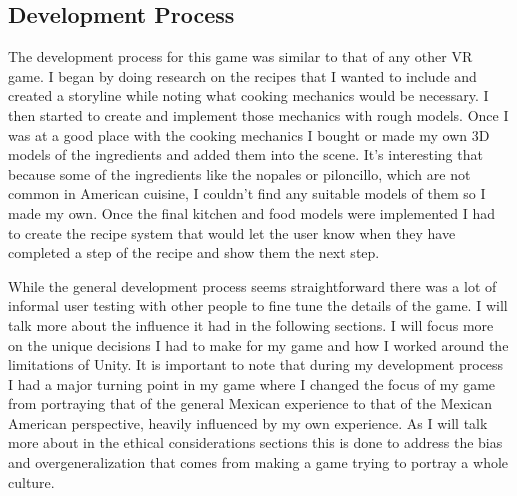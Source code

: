 \documentclass[10pt,twocolumn]{article}
\begin{document}
\subsection{Development Process}
The development process for this game was similar to that of any other VR game. I began by doing research on the recipes that I wanted to include and created a storyline while noting what cooking mechanics would be necessary. I then started to create and implement those mechanics with rough models. Once I was at a good place with the cooking mechanics I bought or made my own 3D models of the ingredients and added them into the scene. It’s interesting that because some of the ingredients like the nopales or piloncillo, which are not common in American cuisine, I couldn’t find any suitable models of them so I made my own. Once the final kitchen and food models were implemented I had to create the recipe system that would let the user know when they have completed a step of the recipe and show them the next step.\par
While the general development process seems straightforward there was a lot of informal user testing with other people to fine tune the details of the game. I will talk more about the influence it had in the following sections. I will focus more on the unique decisions I had to make for my game and how I worked around the limitations of Unity. It is important to note that during my development process I had a major turning point in my game where I changed the focus of my game from portraying that of the general Mexican experience to that of the Mexican American perspective, heavily influenced by my own experience. As I will talk more about in the ethical considerations sections this is done to address the bias and overgeneralization that comes from making a game trying to portray a whole culture. 
\end{document}
